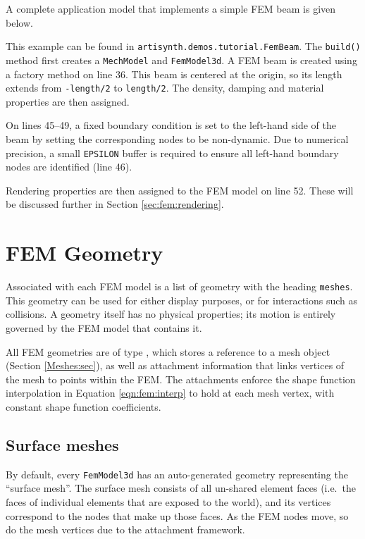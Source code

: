 A complete application model that implements a simple FEM beam is given below.
\lstset{numbers=left}

\lstset{numbers=none}
This example can be found in {\tt artisynth.demos.tutorial.FemBeam}.  The 
{\tt build()} method first creates a {\tt MechModel} and {\tt FemModel3d}.
A FEM beam is created using a factory method on line 36.  This beam is
centered at the origin, so its length extends from {\tt-length/2} to 
{\tt length/2}.  The density, damping and material properties are then 
assigned.  

On lines 45--49, a fixed boundary condition is set to the left-hand side 
of the beam by setting the corresponding nodes to be non-dynamic.  Due to 
numerical precision, a small {\tt EPSILON} buffer is required to ensure 
all left-hand boundary nodes are identified (line 46).

Rendering properties are then assigned to the FEM model on line 52.  These 
will be discussed further in Section \ref{sec:fem:rendering}.

\section{FEM Geometry}
\label{sec:fem:geometry}

Associated with each FEM model is a list of geometry with the heading 
{\tt meshes}.  This geometry can be used for either display purposes, 
or for interactions such as collisions.  A geometry itself has no 
physical properties; its motion is entirely governed by the FEM model 
that contains it.  

All FEM geometries are of type , 
which stores a reference to a mesh object (Section \ref{Meshes:sec}), as well
as attachment information that links vertices of the mesh to points within
the FEM.  The attachments enforce the shape function interpolation in Equation
\eqref{eqn:fem:interp} to hold at each mesh vertex, with constant shape function
coefficients.

\subsection{Surface meshes}

By default, every {\tt FemModel3d} has an auto-generated geometry representing
the ``surface mesh''.  The surface mesh consists of all un-shared element faces
(i.e.~the faces of individual elements that are exposed to the world), and its
vertices correspond to the nodes that make up those faces.  As the FEM nodes
move, so do the mesh vertices due to the attachment framework.

